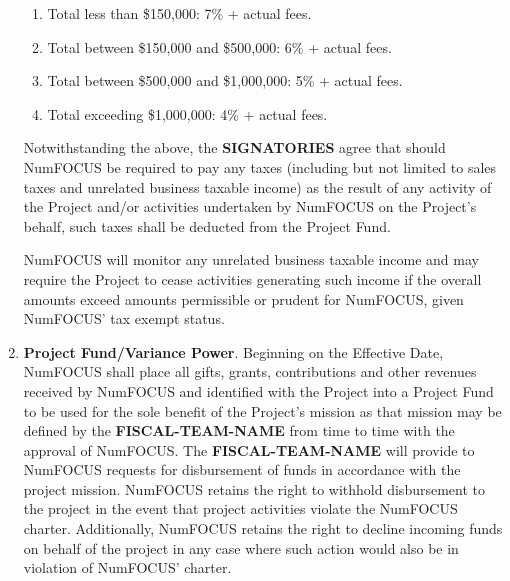 \documentclass[english,letterpaper,12pt]{article}
\newcommand{\signatories}{\textbf{SIGNATORIES}}
\newcommand{\fiscalteam}{\textbf{FISCAL-TEAM-NAME}}
\begin{document}
\begin{enumerate}[label=\arabic*.,ref=\S~\arabic*]
\begin{enumerate}

\item Total less than \$150,000: 7\% + actual fees.

\item Total between \$150,000 and \$500,000: 6\% + actual fees.

\item Total between \$500,000 and \$1,000,000: 5\% + actual fees.

\item Total exceeding \$1,000,000: 4\% + actual fees.

\end{enumerate}


Notwithstanding the above, the \signatories{} agree that should NumFOCUS
be required to pay any taxes (including but not limited to sales taxes
and unrelated business taxable income) as the result of any activity
of the Project and/or activities undertaken by NumFOCUS on the
Project's behalf, such taxes shall be deducted from the Project Fund.

NumFOCUS will monitor any unrelated business taxable income and
may require the Project to cease activities generating such income
if the overall amounts exceed amounts permissible or prudent for NumFOCUS,
given NumFOCUS' tax exempt status.

\item \textbf{Project Fund/Variance Power}. Beginning on the Effective Date,
  NumFOCUS shall place all gifts, grants, contributions and other revenues
  received by NumFOCUS and identified with the Project into a Project Fund to
  be used for the sole benefit of the Project's mission as that mission may be
  defined by the \fiscalteam{} from time to time with the approval of
  NumFOCUS. The \fiscalteam{} will provide to NumFOCUS requests for
  disbursement of funds in accordance with the project mission. NumFOCUS
  retains the right to withhold disbursement to the project in the event that
  project activities violate the NumFOCUS charter.  Additionally, NumFOCUS
  retains the right to decline incoming funds on behalf of the project in any
  case where such action would also be in violation of NumFOCUS' charter.


\end{enumerate}
\end{document}
